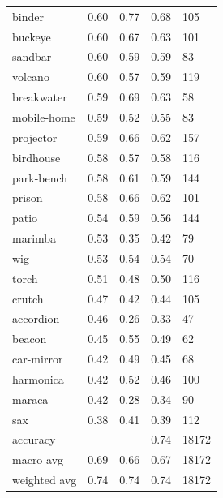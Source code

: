 \begin{center}
\begin{longtable}{lllll}
binder & 0.60 & 0.77 & 0.68 & 105 \\
buckeye & 0.60 & 0.67 & 0.63 & 101 \\
sandbar & 0.60 & 0.59 & 0.59 & 83 \\
volcano & 0.60 & 0.57 & 0.59 & 119 \\
breakwater & 0.59 & 0.69 & 0.63 & 58 \\
mobile-home & 0.59 & 0.52 & 0.55 & 83 \\
projector & 0.59 & 0.66 & 0.62 & 157 \\
birdhouse & 0.58 & 0.57 & 0.58 & 116 \\
park-bench & 0.58 & 0.61 & 0.59 & 144 \\
prison & 0.58 & 0.66 & 0.62 & 101 \\
patio & 0.54 & 0.59 & 0.56 & 144 \\
marimba & 0.53 & 0.35 & 0.42 & 79 \\
wig & 0.53 & 0.54 & 0.54 & 70 \\
torch & 0.51 & 0.48 & 0.50 & 116 \\
crutch & 0.47 & 0.42 & 0.44 & 105 \\
accordion & 0.46 & 0.26 & 0.33 & 47 \\
beacon & 0.45 & 0.55 & 0.49 & 62 \\
car-mirror & 0.42 & 0.49 & 0.45 & 68 \\
harmonica & 0.42 & 0.52 & 0.46 & 100 \\
maraca & 0.42 & 0.28 & 0.34 & 90 \\
sax & 0.38 & 0.41 & 0.39 & 112 \\
\midrule
accuracy &  &  & 0.74 & 18172 \\
macro avg & 0.69 & 0.66 & 0.67 & 18172 \\
weighted avg & 0.74 & 0.74 & 0.74 & 18172 \\
\bottomrule
\end{longtable}
\end{center}

